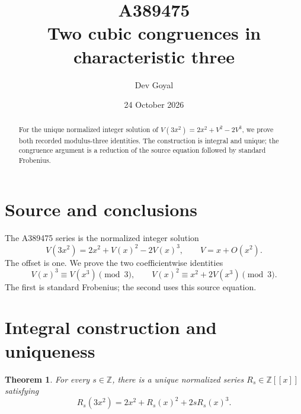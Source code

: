 \documentclass[11pt,a4paper]{article}
\title{A389475\\[3pt]Two cubic congruences in characteristic three}
\author{Dev Goyal}
\date{24 October 2026}
\newtheorem{theorem}{Theorem}[section]
\theoremstyle{remark}
\newcommand{\Z}{\mathbb Z}
\newcommand{\ps}[1]{#1[[x]]}
\begin{document}
\maketitle
\begin{center}
\end{center}
\begin{abstract}
For the unique normalized integer solution of $V(3x^2)=2x^2+V^2-2V^3$, we prove both recorded modulus-three identities. The construction is integral and unique; the congruence argument is a reduction of the source equation followed by standard Frobenius.
\end{abstract}
\section{Source and conclusions}
The A389475 series \cite{oeis} is the normalized integer solution
\[
V(3x^2)=2x^2+V(x)^2-2V(x)^3,\qquad V=x+O(x^2).
\]
The offset is one. We prove the two coefficientwise identities
\[
V(x)^3\equiv V(x^3)\pmod3,\qquad
V(x)^2\equiv x^2+2V(x^3)\pmod3.
\]
The first is standard Frobenius; the second uses this source equation.
\section{Integral construction and uniqueness}

\begin{theorem}\label{thm:cubicexist}
For every $s\in\Z$, there is a unique normalized series
$R_s\in\ps{\Z}$ satisfying
\begin{equation}\label{eq:cubicfamily}
R_s(3x^2)=2x^2+R_s(x)^2+2sR_s(x)^3.
\end{equation}
\end{theorem}
\end{document}
